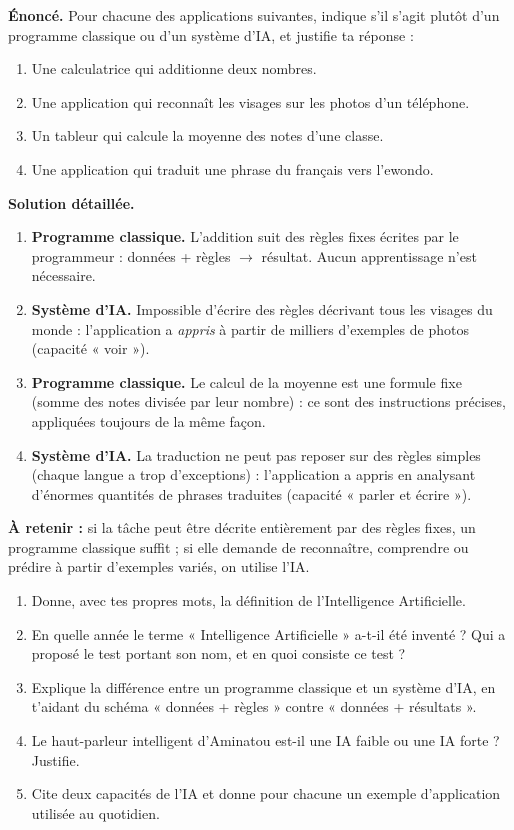 \documentclass[11pt]{article}
\begin{document}
\begin{exoresolu}
\textbf{Énoncé.} Pour chacune des applications suivantes, indique s'il s'agit plutôt d'un programme classique ou d'un système d'IA, et justifie ta réponse :
\begin{enumerate}
\item Une calculatrice qui additionne deux nombres.
\item Une application qui reconnaît les visages sur les photos d'un téléphone.
\item Un tableur qui calcule la moyenne des notes d'une classe.
\item Une application qui traduit une phrase du français vers l'ewondo.
\end{enumerate}
\tcblower
\textbf{Solution détaillée.}
\begin{enumerate}
\item \textbf{Programme classique.} L'addition suit des règles fixes écrites par le programmeur : données + règles $\rightarrow$ résultat. Aucun apprentissage n'est nécessaire.
\item \textbf{Système d'IA.} Impossible d'écrire des règles décrivant tous les visages du monde : l'application a \emph{appris} à partir de milliers d'exemples de photos (capacité « voir »).
\item \textbf{Programme classique.} Le calcul de la moyenne est une formule fixe (somme des notes divisée par leur nombre) : ce sont des instructions précises, appliquées toujours de la même façon.
\item \textbf{Système d'IA.} La traduction ne peut pas reposer sur des règles simples (chaque langue a trop d'exceptions) : l'application a appris en analysant d'énormes quantités de phrases traduites (capacité « parler et écrire »).
\end{enumerate}
\textbf{À retenir :} si la tâche peut être décrite entièrement par des règles fixes, un programme classique suffit ; si elle demande de reconnaître, comprendre ou prédire à partir d'exemples variés, on utilise l'IA.
\end{exoresolu}

\begin{exercice}
\begin{enumerate}
\item Donne, avec tes propres mots, la définition de l'Intelligence Artificielle.
\item En quelle année le terme « Intelligence Artificielle » a-t-il été inventé ? Qui a proposé le test portant son nom, et en quoi consiste ce test ?
\item Explique la différence entre un programme classique et un système d'IA, en t'aidant du schéma « données + règles » contre « données + résultats ».
\item Le haut-parleur intelligent d'Aminatou est-il une IA faible ou une IA forte ? Justifie.
\item Cite deux capacités de l'IA et donne pour chacune un exemple d'application utilisée au quotidien.
\end{enumerate}
\end{exercice}
\end{document}
